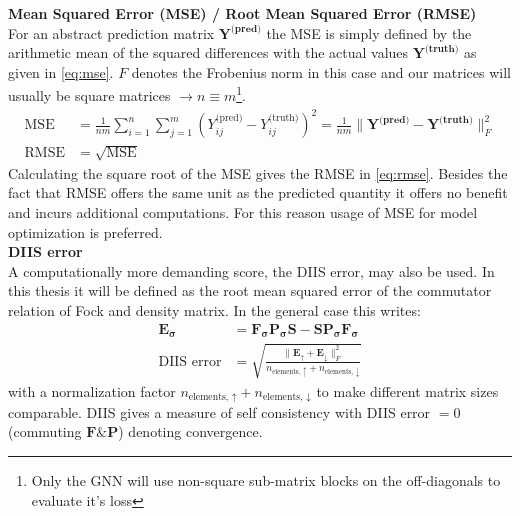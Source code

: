 \textbf{Mean Squared Error (MSE) / Root Mean Squared Error (RMSE)}\\
For an abstract prediction matrix $\mathbf{Y^\text{(pred)}}$ the MSE is simply defined by the arithmetic mean of the squared differences with the actual values $\mathbf{Y^\text{(truth)}}$ as given in \autoref{eq:mse}. $F$ denotes the Frobenius norm in this case and our matrices will usually be square matrices $\rightarrow n \equiv m$\footnote{Only the GNN will use non-square sub-matrix blocks on the off-diagonals to evaluate it's loss}.  
\begin{subequations}
\begin{align}
\text{MSE} &= \frac{1}{nm} \sum_{i=1}^{n} \sum_{j=1}^{m} \left( Y^\text{(pred)}_{ij} - Y^\text{(truth)}_{ij} \right)^2 = \frac{1}{nm} \|\mathbf{Y^\text{(pred)}} - \mathbf{Y^\text{(truth)}}\|_F^2 \label{eq:mse}\\
\text{RMSE} &= \sqrt{ \text{MSE}}\label{eq:rmse}
\end{align}
\end{subequations}
Calculating the square root of the MSE gives the RMSE in \autoref{eq:rmse}. Besides the fact that RMSE offers the same unit as the predicted quantity it offers no benefit and incurs additional computations. For this reason usage of MSE for model optimization is preferred. \\

\textbf{DIIS error}\\
A computationally more demanding score, the DIIS error, may also be used. In this thesis it will be defined as the root mean squared error of the commutator relation of Fock and density matrix. In the general case this writes: 
\begin{subequations}
\begin{align}
\mathbf{E_\sigma} &= \mathbf{F_\sigma} \mathbf{P_\sigma} \mathbf{S} - \mathbf{S} \mathbf{P_\sigma} \mathbf{F_\sigma}\\
\text{DIIS error} &= \sqrt{\frac{\|\mathbf{E_\uparrow} + \mathbf{E_\downarrow}\|^2_F}{n_\text{elements, $\uparrow$} + n_\text{elements, $\downarrow$}}}\label{eq:diis_error}
\end{align}
\end{subequations}
with a normalization factor $n_\text{elements, $\uparrow$} + n_\text{elements, $\downarrow$}$ to make different matrix sizes comparable. DIIS gives a measure of self consistency with DIIS error $=0$ (commuting $\mathbf{F} \& \mathbf{P}$) denoting convergence. 
